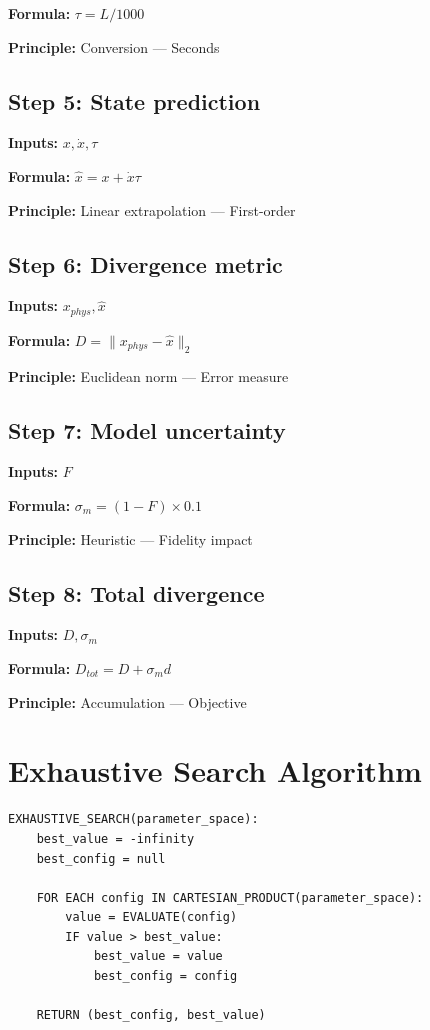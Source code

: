 \documentclass[11pt,twocolumn]{article}
\begin{document}
\textbf{Formula:} $\tau = L/1000$

\textbf{Principle:} Conversion --- Seconds

\subsection*{Step 5: State prediction}
\textbf{Inputs:} $x, \dot{x}, \tau$

\textbf{Formula:} $\hat{x} = x + \dot{x}\tau$

\textbf{Principle:} Linear extrapolation --- First-order

\subsection*{Step 6: Divergence metric}
\textbf{Inputs:} $x_{phys}, \hat{x}$

\textbf{Formula:} $D = \|x_{phys} - \hat{x}\|_2$

\textbf{Principle:} Euclidean norm --- Error measure

\subsection*{Step 7: Model uncertainty}
\textbf{Inputs:} $F$

\textbf{Formula:} $\sigma_m = (1-F) \times 0.1$

\textbf{Principle:} Heuristic --- Fidelity impact

\subsection*{Step 8: Total divergence}
\textbf{Inputs:} $D, \sigma_m$

\textbf{Formula:} $D_{tot} = D + \sigma_m d$

\textbf{Principle:} Accumulation --- Objective


\section{Exhaustive Search Algorithm}

\begin{verbatim}
EXHAUSTIVE_SEARCH(parameter_space):
    best_value = -infinity
    best_config = null
    
    FOR EACH config IN CARTESIAN_PRODUCT(parameter_space):
        value = EVALUATE(config)
        IF value > best_value:
            best_value = value
            best_config = config
    
    RETURN (best_config, best_value)
\end{verbatim}
\end{document}
